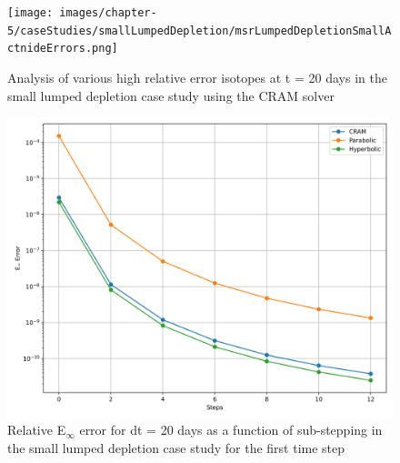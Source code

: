 \clearpage

\begin{figure}[p]
    \centering
    \texttt{[image: images/chapter-5/caseStudies/smallLumpedDepletion/msrLumpedDepletionSmallActnideErrors.png]}
    \caption{Analysis of various high relative error isotopes at t = 20 days in the small lumped depletion case study using the CRAM solver}
    \label{fig:small_lumped_depletion_actnide_errors}
\end{figure}

\clearpage

\begin{figure}[p]
    \centering
    \includegraphics[width=5in]{images/chapter-5/caseStudies/smallLumpedDepletion/msrSmallLumpedDepletionEinfErrorerrorWithSteps.png}
    \caption{Relative E$_{\infty}$ error for dt = 20 days as a function of sub-stepping in the small lumped depletion case study for the first time step}
    \label{fig:small_lumped_depletion_Einf_with_substeps}
\end{figure}

\clearpage

